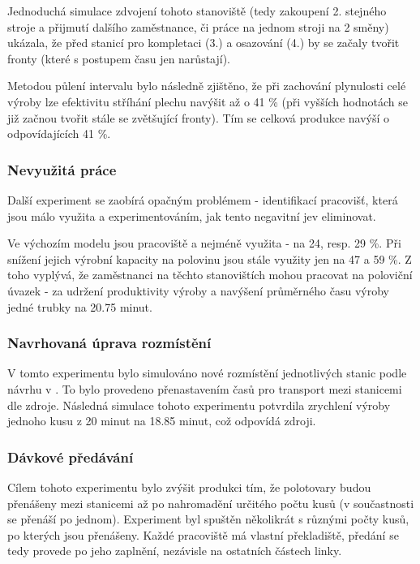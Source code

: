 \documentclass[11pt, a4paper]{article}
\begin{document}
Jednoduchá simulace zdvojení tohoto stanoviště (tedy zakoupení 2. stejného stroje a přijmutí dalšího zaměstnance, či práce na jednom stroji na 2 směny) ukázala, že před stanicí pro kompletaci (3.) a osazování (4.) by se začaly tvořit fronty (které s postupem času jen narůstají).

Metodou půlení intervalu bylo následně zjištěno, že při zachování plynulosti celé výroby lze efektivitu stříhání plechu navýšit až o 41 \% (při vyšších hodnotách se již začnou tvořit stále se zvětšující fronty). Tím se celková produkce navýší o odpovídajících 41 \%.

\subsubsection{Nevyužitá práce}
Další experiment se zaobírá opačným problémem - identifikací pracovišť, která jsou málo využita a experimentováním, jak tento negavitní jev eliminovat.

Ve výchozím modelu jsou pracoviště  a  nejméně využita - na 24, resp. 29 \%. Při snížení jejich výrobní kapacity na polovinu jsou stále využity jen na 47 a 59 \%. Z toho vyplývá, že zaměstnanci na těchto stanovištích mohou pracovat na poloviční úvazek - za udržení produktivity výroby a navýšení průměrného času výroby jedné trubky na 20.75 minut.


\subsubsection{Navrhovaná úprava rozmístění}
V tomto experimentu bylo simulováno nové rozmístění jednotlivých stanic podle návrhu v \cite[str. 51]{bp}. To bylo provedeno přenastavením časů pro transport mezi stanicemi dle zdroje. Následná simulace tohoto experimentu potvrdila zrychlení výroby jednoho kusu z 20 minut na 18.85 minut, což odpovídá zdroji.


\subsubsection{Dávkové předávání}
Cílem tohoto experimentu bylo zvýšit produkci tím, že polotovary budou přenášeny mezi stanicemi až po nahromadění určitého počtu kusů (v součastnosti se přenáší po jednom). Experiment byl spuštěn několikrát s různými počty kusů, po kterých jsou přenášeny. Každé pracoviště má vlastní překladiště, předání se tedy provede po jeho zaplnění, nezávisle na ostatních částech linky.
\end{document}
